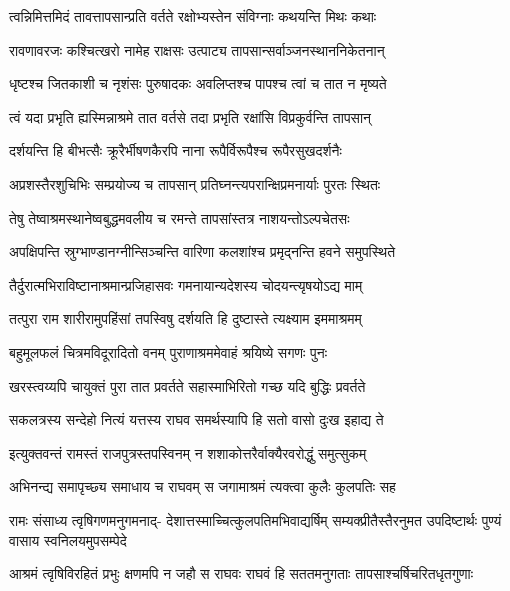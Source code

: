 \twolineshloka
{त्वन्निमित्तमिदं तावत्तापसान्प्रति वर्तते}
{रक्षोभ्यस्तेन संविग्नाः कथयन्ति मिथः कथाः} %

\twolineshloka
{रावणावरजः कश्चित्खरो नामेह राक्षसः}
{उत्पाट्य तापसान्सर्वाञ्जनस्थाननिकेतनान्} %

\twolineshloka
{धृष्टश्च जितकाशी च नृशंसः पुरुषादकः}
{अवलिप्तश्च पापश्च त्वां च तात न मृष्यते} %

\twolineshloka
{त्वं यदा प्रभृति ह्यस्मिन्नाश्रमे तात वर्तसे}
{तदा प्रभृति रक्षांसि विप्रकुर्वन्ति तापसान्} %

\twolineshloka
{दर्शयन्ति हि बीभत्सैः क्रूरैर्भीषणकैरपि}
{नाना रूपैर्विरूपैश्च रूपैरसुखदर्शनैः} %

\twolineshloka
{अप्रशस्तैरशुचिभिः सम्प्रयोज्य च तापसान्}
{प्रतिघ्नन्त्यपरान्क्षिप्रमनार्याः पुरतः स्थितः} %

\twolineshloka
{तेषु तेष्वाश्रमस्थानेष्वबुद्धमवलीय च}
{रमन्ते तापसांस्तत्र नाशयन्तोऽल्पचेतसः} %

\twolineshloka
{अपक्षिपन्ति स्रुग्भाण्डानग्नीन्सिञ्चन्ति वारिणा}
{कलशांश्च प्रमृद्नन्ति हवने समुपस्थिते} %

\twolineshloka
{तैर्दुरात्मभिराविष्टानाश्रमान्प्रजिहासवः}
{गमनायान्यदेशस्य चोदयन्त्यृषयोऽद्य माम्} %

\twolineshloka
{तत्पुरा राम शारीरामुपहिंसां तपस्विषु}
{दर्शयति हि दुष्टास्ते त्यक्ष्याम इममाश्रमम्} %

\twolineshloka
{बहुमूलफलं चित्रमविदूरादितो वनम्}
{पुराणाश्रममेवाहं श्रयिष्ये सगणः पुनः} %

\twolineshloka
{खरस्त्वय्यपि चायुक्तं पुरा तात प्रवर्तते}
{सहास्माभिरितो गच्छ यदि बुद्धिः प्रवर्तते} %

\twolineshloka
{सकलत्रस्य सन्देहो नित्यं यत्तस्य राघव}
{समर्थस्यापि हि सतो वासो दुःख इहाद्य ते} %

\twolineshloka
{इत्युक्तवन्तं रामस्तं राजपुत्रस्तपस्विनम्}
{न शशाकोत्तरैर्वाक्यैरवरोद्धुं समुत्सुकम्} %

\twolineshloka
{अभिनन्द्य समापृच्छ्य समाधाय च राघवम्}
{स जगामाश्रमं त्यक्त्वा कुलैः कुलपतिः सह} %

\fourlineindentedshloka
{रामः संसाध्य त्वृषिगणमनुगमनाद्-}
{देशात्तस्माच्चित्कुलपतिमभिवाद्यर्षिम्}
{सम्यक्प्रीतैस्तैरनुमत उपदिष्टार्थः}
{पुण्यं वासाय स्वनिलयमुपसम्पेदे} %

\fourlineindentedshloka
{आश्रमं त्वृषिविरहितं प्रभुः}
{क्षणमपि न जहौ स राघवः}
{राघवं हि सततमनुगताः}
{तापसाश्चर्षिचरितधृतगुणाः} %



